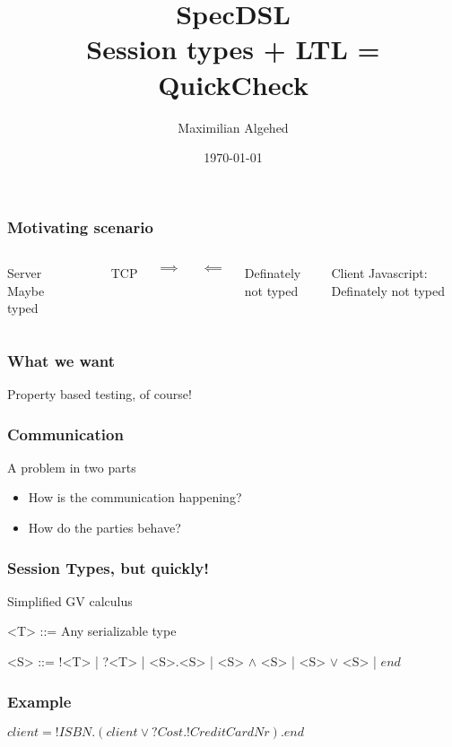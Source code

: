 \documentclass{beamer}
\title[SpecDSL]{SpecDSL \\ \large{Session types + LTL = QuickCheck}}
\author{Maximilian Algehed} %
\institute[CTH] %
{
Chalmers University of Technology \\ %
\medskip
\textit{m.algehed@gmail.com} %
}
\date{\today} %
\begin{document}
\begin{frame}
    \titlepage %
\end{frame}

\begin{frame}
    \frametitle{Motivating scenario}
    \begin{columns}
        \begin{block}{Server}
            \small{Maybe typed}
        \end{block}

        \\
        \centerline{TCP}
        \centerline{\Large{$\implies$}}
        \centerline{\Large{$\impliedby$}}
        \centerline{Definately not typed}

        \begin{block}{Client}
            \small{Javascript: Definately not typed}
        \end{block}
        
    \end{columns}
\end{frame}

\begin{frame}
    \frametitle{What we want}
    \centering
    \Large{Property based testing, of course!}
\end{frame}

\begin{frame}
    \frametitle{Communication}
    \Large{A problem in two parts}
    \begin{itemize}
        \item How is the communication happening?
        \item How do the parties behave?
    \end{itemize}
\end{frame}

\begin{frame}[fragile]
    \frametitle{Session Types, but quickly!}
    \large{Simplified GV calculus}
    \\
    \begin{grammar}
        <T> ::= Any serializable type

        <S> ::= !<T> | ?<T> | <S>.<S> | <S> $\wedge$ <S> | <S> $\vee$ <S> | $end$
    \end{grammar}
\end{frame}

\begin{frame}[fragile]
    \frametitle{Example}
    \Large{$client = !ISBN.(client \vee ?Cost.!CreditCardNr).end$}
\end{frame}
\end{document}
